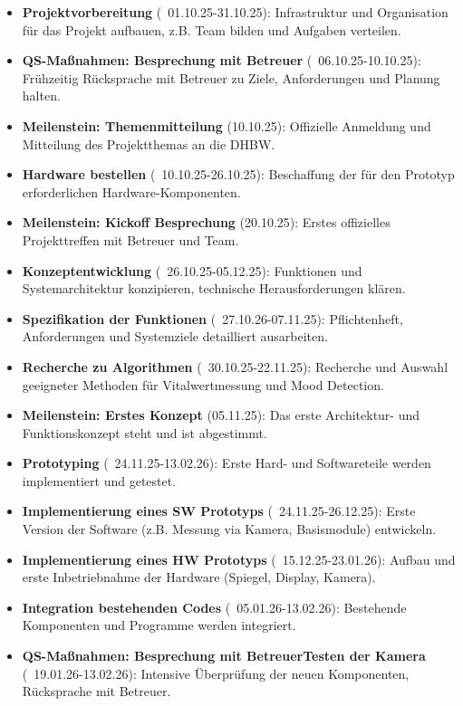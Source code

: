 \newpage
\begin{itemize}
    \item \textbf{Projektvorbereitung} (~01.10.25-31.10.25): Infrastruktur und Organisation für das Projekt aufbauen, z.B. Team bilden und Aufgaben verteilen.
    \item \textbf{QS-Maßnahmen: Besprechung mit Betreuer} (~06.10.25-10.10.25): Frühzeitig Rücksprache mit Betreuer zu Ziele, Anforderungen und Planung halten.
    \item \textbf{Meilenstein: Themenmitteilung} (10.10.25): Offizielle Anmeldung und Mitteilung des Projektthemas an die DHBW.
    \item \textbf{Hardware bestellen} (~10.10.25-26.10.25): Beschaffung der für den Prototyp erforderlichen Hardware-Komponenten.
    \item \textbf{Meilenstein: Kickoff Besprechung} (20.10.25): Erstes offizielles Projekttreffen mit Betreuer und Team.
    \item \textbf{Konzeptentwicklung} (~26.10.25-05.12.25): Funktionen und Systemarchitektur konzipieren, technische Herausforderungen klären.
    \item \textbf{Spezifikation der Funktionen} (~27.10.26-07.11.25): Pflichtenheft, Anforderungen und Systemziele detailliert ausarbeiten.
    \item \textbf{Recherche zu Algorithmen} (~30.10.25-22.11.25): Recherche und Auswahl geeigneter Methoden für Vitalwertmessung und Mood Detection.
    \item \textbf{Meilenstein: Erstes Konzept} (05.11.25): Das erste Architektur- und Funktionskonzept steht und ist abgestimmt.
    \item \textbf{Prototyping} (~24.11.25-13.02.26): Erste Hard- und Softwareteile werden implementiert und getestet.
    \item \textbf{Implementierung eines SW Prototyps} (~24.11.25-26.12.25): Erste Version der Software (z.B. Messung via Kamera, Basismodule) entwickeln.
    \item \textbf{Implementierung eines HW Prototyps} (~15.12.25-23.01.26): Aufbau und erste Inbetriebnahme der Hardware (Spiegel, Display, Kamera).
    \item \textbf{Integration bestehenden Codes} (~05.01.26-13.02.26): Bestehende Komponenten und Programme werden integriert.
    \item \textbf{QS-Maßnahmen: Besprechung mit Betreuer\/Testen der Kamera} (~19.01.26-13.02.26): Intensive Überprüfung der neuen Komponenten, Rücksprache mit Betreuer.

\end{itemize}
